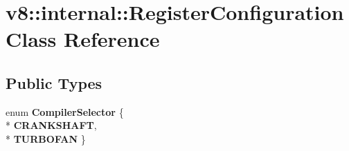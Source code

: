 \hypertarget{classv8_1_1internal_1_1_register_configuration}{}\section{v8\+:\+:internal\+:\+:Register\+Configuration Class Reference}
\label{classv8_1_1internal_1_1_register_configuration}
\subsection*{Public Types}
\begin{DoxyCompactItemize}
\item 
enum {\bfseries Compiler\+Selector} \{ \\*
{\bfseries C\+R\+A\+N\+K\+S\+H\+A\+FT}, 
\\*
{\bfseries T\+U\+R\+B\+O\+F\+AN}
 \}\hypertarget{classv8_1_1internal_1_1_register_configuration_aba21e38f08763ea313b7f039521f349c}{}\label{classv8_1_1internal_1_1_register_configuration_aba21e38f08763ea313b7f039521f349c}

\end{DoxyCompactItemize}
